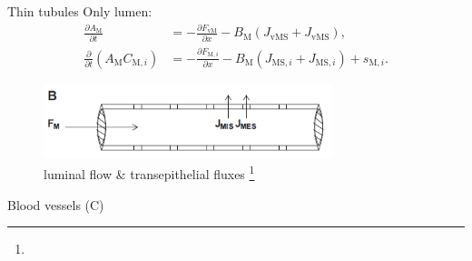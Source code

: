 \documentclass{beamer}
\begin{document}
\begin{frame}{Thin tubules}
    Only lumen:
    \begin{align}
        \frac{\partial A_\mathrm{M}}{\partial t} &= -\frac{\partial F_\mathrm{vM}}{\partial x}-B_\mathrm{M}\left(J_\mathrm{vMS}+J_\mathrm{vMS}\right),\\
        \frac{\partial }{\partial t}\left(A_\mathrm{M}C_{\mathrm{M},i}\right) &= -\frac{\partial F_{\mathrm{M},i}}{\partial x}-B_\mathrm{M}\left(J_{\mathrm{MS},i}+J_{\mathrm{MS},i}\right)+s_{\mathrm{M},i}.
    \end{align}
    \begin{figure}
        \centering
        \includegraphics[width=0.75\textwidth]{figures/thin_tubule.png}    
        \caption{luminal flow \& transepithelial fluxes \citep{Weinstein2015}\footnote[frame,1]{\tiny{}}}
    \end{figure}
\end{frame}

\begin{frame}{Blood vessels (C)}
\end{frame}
\end{document}
